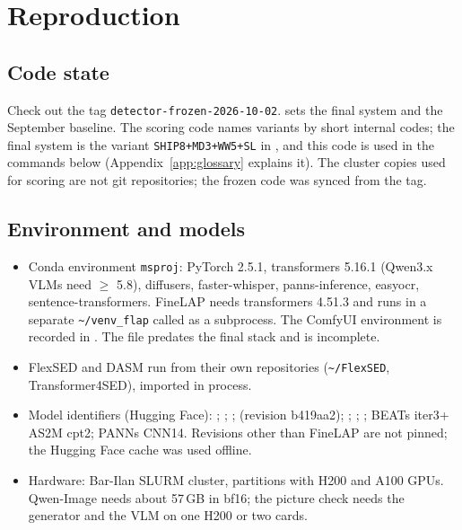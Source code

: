 \section{Reproduction}\label{sec:repro}

\subsection{Code state}
Check out the tag \texttt{detector-frozen-2026-10-02}.  sets the final system and
 the September baseline. The scoring code names variants by short internal codes; the final
system is the variant \texttt{SHIP8+MD3+WW5+SL} in , and this code is used in the
commands below (Appendix~\ref{app:glossary} explains it). The cluster copies used for scoring are not git
repositories; the frozen code was synced from the tag.

\subsection{Environment and models}
\begin{itemize}
  \item Conda environment \texttt{msproj}: PyTorch 2.5.1, transformers 5.16.1 (Qwen3.x VLMs need $\geq$ 5.8), diffusers,
        faster-whisper, panns-inference, easyocr, sentence-transformers. FineLAP needs transformers 4.51.3 and runs in a
        separate \texttt{\textasciitilde/venv\_flap} called as a subprocess. The ComfyUI environment is recorded in
        . The  file predates the final stack and is incomplete.
  \item FlexSED and DASM run from their own repositories (\texttt{\textasciitilde/FlexSED}, Transformer4SED), imported in
        process.
  \item Model identifiers (Hugging Face): ; ;
        ;  (revision b419aa2); ;
        ; ; BEATs iter3+ AS2M cpt2; PANNs CNN14.
        Revisions other than FineLAP are not pinned; the Hugging Face cache was used offline.
  \item Hardware: Bar-Ilan SLURM cluster, partitions with H200 and A100 GPUs. Qwen-Image needs about 57\,GB in bf16; the
        picture check needs the generator and the VLM on one H200 or two cards.
\end{itemize}

